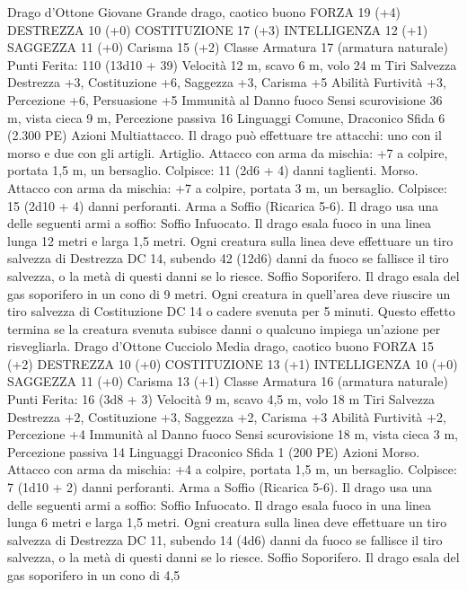 \begin{multicols}{2}
Drago d’Ottone Giovane
Grande drago, caotico buono
FORZA 19 (+4)
DESTREZZA 10 (+0)
COSTITUZIONE 17 (+3)
INTELLIGENZA 12 (+1)
SAGGEZZA 11 (+0)
Carisma 15 (+2)
Classe Armatura 17 (armatura naturale)
\hspace*{0pt}\hfill{Punti Ferita}: 110 (13d10 + 39)
Velocità 12 m, scavo 6 m, volo 24 m
Tiri Salvezza Destrezza +3, Costituzione +6, Saggezza +3,
Carisma +5
Abilità Furtività +3, Percezione +6, Persuasione +5
Immunità al Danno fuoco
Sensi scurovisione 36 m, vista cieca 9 m, Percezione passiva 16
Linguaggi Comune, Draconico
Sfida 6 (2.300 PE)
Azioni
Multiattacco. Il drago può effettuare tre attacchi: uno con il
morso e due con gli artigli.
Artiglio. Attacco con arma da mischia: +7 a colpire, portata 1,5
m, un bersaglio.
Colpisce: 11 (2d6 + 4) danni taglienti.
Morso. Attacco con arma da mischia: +7 a colpire, portata 3 m,
un bersaglio.
Colpisce: 15 (2d10 + 4) danni perforanti.
Arma a Soffio (Ricarica 5-6). Il drago usa una delle seguenti armi
a soffio:
Soffio Infuocato. Il drago esala fuoco in una linea lunga 12 metri e
larga 1,5 metri. Ogni creatura sulla linea deve effettuare un tiro
salvezza di Destrezza DC 14, subendo 42 (12d6) danni da fuoco se
fallisce il tiro salvezza, o la metà di questi danni se lo riesce.
Soffio Soporifero. Il drago esala del gas soporifero in un cono di 9
metri. Ogni creatura in quell’area deve riuscire un tiro salvezza di
Costituzione DC 14 o cadere svenuta per 5 minuti. Questo effetto
termina se la creatura svenuta subisce danni o qualcuno impiega
un’azione per risvegliarla.
Drago d’Ottone Cucciolo
Media drago, caotico buono
FORZA 15 (+2)
DESTREZZA 10 (+0)
COSTITUZIONE 13 (+1)
INTELLIGENZA 10 (+0)
SAGGEZZA 11 (+0)
Carisma 13 (+1)
Classe Armatura 16 (armatura naturale)
\hspace*{0pt}\hfill{Punti Ferita}: 16 (3d8 + 3)
Velocità 9 m, scavo 4,5 m, volo 18 m
Tiri Salvezza Destrezza +2, Costituzione +3, Saggezza +2,
Carisma +3
Abilità Furtività +2, Percezione +4
Immunità al Danno fuoco
Sensi scurovisione 18 m, vista cieca 3 m, Percezione passiva 14
Linguaggi Draconico
Sfida 1 (200 PE)
Azioni
Morso. Attacco con arma da mischia: +4 a colpire, portata 1,5
m, un bersaglio.
Colpisce: 7 (1d10 + 2) danni perforanti.
Arma a Soffio (Ricarica 5-6). Il drago usa una delle seguenti armi
a soffio:
Soffio Infuocato. Il drago esala fuoco in una linea lunga 6 metri e
larga 1,5 metri. Ogni creatura sulla linea deve effettuare un tiro
salvezza di Destrezza DC 11, subendo 14 (4d6) danni da fuoco se
fallisce il tiro salvezza, o la metà di questi danni se lo riesce.
Soffio Soporifero. Il drago esala del gas soporifero in un cono di 4,5

\end{multicols}
